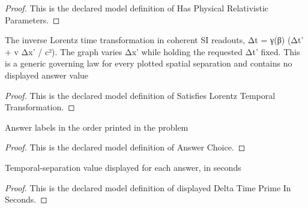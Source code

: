 \begin{proof}
  This is the declared model definition of Has Physical Relativistic Parameters.
\end{proof}
\begin{definition}
  \label{def:physics:phyx-mini-0598:phyxminiproblems-problemphyxmini0598-satisfieslorentztemporaltransformation}
  The inverse Lorentz time transformation in coherent SI readouts, Δt = γ(β) (Δt' + v Δx' / c²). The graph varies Δx' while holding the requested Δt' fixed. This is a generic governing law for every plotted spatial separation and contains no displayed answer value
\end{definition}
\begin{proof}
  This is the declared model definition of Satisfies Lorentz Temporal Transformation.
\end{proof}
\begin{definition}
  \label{def:physics:phyx-mini-0598:phyxminiproblems-problemphyxmini0598-answerchoice}
  Answer labels in the order printed in the problem
\end{definition}
\begin{proof}
  This is the declared model definition of Answer Choice.
\end{proof}
\begin{definition}
  \label{def:physics:phyx-mini-0598:phyxminiproblems-problemphyxmini0598-displayeddeltatimeprimeinseconds}
  Temporal-separation value displayed for each answer, in seconds
\end{definition}
\begin{proof}
  This is the declared model definition of displayed Delta Time Prime In Seconds.
\end{proof}
